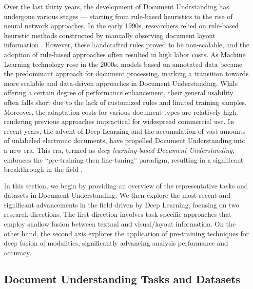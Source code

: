 Over the last thirty years, the development of Document Undrstanding has undergone various stages — starting from rule-based heuristics to the rise of neural network approaches. In the early 1990s, researchers relied on rule-based heuristic methods constructed by manually observing document layout information \citep{wong1982document, fisher1990rule, lebourgeois1992fast}. However, these handcrafted rules proved to be non-scalable, and the adoption of rule-based approaches often resulted in high labor costs. As Machine Learning technology rose in the 2000s, models based on annotated data \citep{baechler2011multi, wei2013evaluation} became the predominant approach for document processing, marking a transition towards more scalable and data-driven approaches in Document Understanding. While offering a certain degree of performance enhancement, their general usability often falls short due to the lack of customized rules and limited training samples. Moreover, the adaptation costs for various document types are relatively high, rendering previous approaches impractical for widespread commercial use. In recent years, the advent of Deep Learning and the accumulation of vast amounts of unlabeled electronic documents, have propelled Document Understanding into a new era. This era, termed as \textit{deep learning-based Document Understanding}, embraces the “pre-training then fine-tuning” paradigm, resulting in a significant breakthrough in the field \citep{xu2020layoutlm, peng2022ernie}.

In this section, we begin by providing an overview of the representative tasks and datasets in Document Understanding. We then explore the most recent and significant advancements in the field driven by Deep Learning, focusing on two research directions. The first direction involves task-specific approaches that employ shallow fusion between textual and visual/layout information. On the other hand, the second axis explores the application of pre-training techniques for deep fusion of modalities, significantly advancing analysis performance and accuracy. 


\subsection{Document Understanding Tasks and Datasets}


